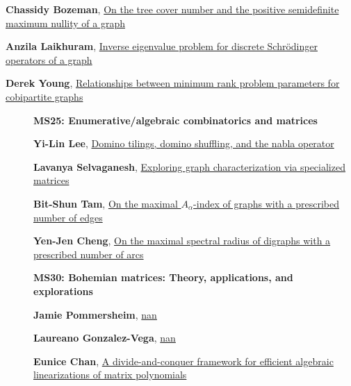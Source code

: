 \documentclass[ILAS2025-program.tex]{subfiles}
\begin{document}
\begin{description}
\begin{description}
{}
        \item[\info{16:30\textrm{--}17:00}] \hypertarget{up0222}{}\textbf{Chassidy Bozeman}, \hyperlink{down0222}{On the tree cover number and the positive semidefinite maximum nullity of a graph}
        \item[\info{17:00\textrm{--}17:30}] \hypertarget{up0223}{}\textbf{Anzila Laikhuram}, \hyperlink{down0223}{Inverse eigenvalue problem for discrete Schrödinger operators of a graph}
        \item[\info{17:30\textrm{--}18:00}] \hypertarget{up0224}{}\textbf{Derek Young}, \hyperlink{down0224}{Relationships between minimum rank problem parameters for cobipartite graphs}
        \end{description}
    \begin{description}
    \item[] {\color{mstitle}\textbf{MS25: Enumerative/algebraic combinatorics and matrices}} 
    \item[] \hypertarget{up0225}{}\textbf{Yi-Lin Lee}, \hyperlink{down0225}{Domino tilings, domino shuffling, and the nabla operator}
        \item[] \hypertarget{up0226}{}\textbf{Lavanya Selvaganesh}, \hyperlink{down0226}{Exploring graph characterization via specialized matrices
}
        \item[] \hypertarget{up0227}{}\textbf{Bit-Shun Tam}, \hyperlink{down0227}{On the maximal $A_\alpha$-index of graphs with a prescribed number of edges}
        \item[] \hypertarget{up0228}{}\textbf{Yen-Jen Cheng}, \hyperlink{down0228}{On the maximal spectral radius of digraphs with a prescribed number of arcs
}
        \end{description}
    \begin{description}
    \item[] {\color{mstitle}\textbf{MS30: Bohemian matrices: Theory, applications, and explorations}} 
    \item[] \hypertarget{up0229}{}\textbf{Jamie Pommersheim}, \hyperlink{down0229}{nan}
        \item[] \hypertarget{up0230}{}\textbf{Laureano Gonzalez-Vega}, \hyperlink{down0230}{nan}
        \item[] \hypertarget{up0231}{}\textbf{Eunice Chan}, \hyperlink{down0231}{A divide-and-conquer framework for efficient algebraic linearizations of matrix polynomials}

\end{description}
\end{description}
\end{document}
